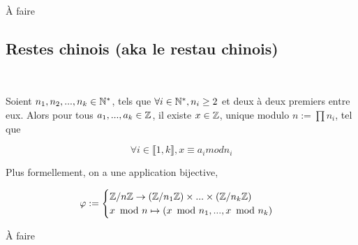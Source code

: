 \documentclass[a4paper, 12pt]{article}
\begin{document}
\begin{demonstration}
    À faire
\end{demonstration}




\subsection{Restes chinois (aka le restau chinois)}

\begin{theorem}\

    Soient $n_1, n_2, ..., n_k \in \mathbb{N}^*$, tels que $\forall i \in \mathbb{N}^*, n_i \geq 2$ et deux à deux premiers entre eux.
    Alors pour tous $a_1, ..., a_k \in \mathbb{Z}$, il existe $x \in \mathbb{Z}$, unique modulo
    $n := \prod n_i$, tel que

    $$
        \forall i \in \llbracket1, k\rrbracket, x \equiv a_i mod n_i
    $$
    
    \vspace{2cm}

    Plus formellement, on a une application bijective,

    $$
    \varphi :=
    \begin{cases}
        \mathbb{Z}/n\mathbb{Z} \to (\mathbb{Z}/n_1\mathbb{Z}) \times ... \times (\mathbb{Z}/n_k\mathbb{Z}) \\
        x\!\mod n \mapsto (x\!\mod n_1, ..., x\!\mod n_k)
    \end{cases}
    $$
\end{theorem}

\begin{demonstration}
    À faire
\end{demonstration}






\end{document}
